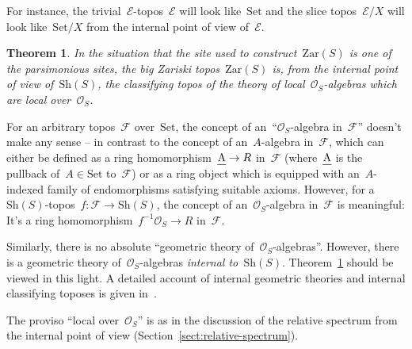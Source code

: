 \documentclass[10pt,reqno,a4paper]{amsbook}
\theoremstyle{definition}
\theoremstyle{plain}
\newtheorem{thm}[defn]{Theorem}
\theoremstyle{remark}
\newcommand{\E}{\mathcal{E}}
\newcommand{\F}{\mathcal{F}}
\renewcommand{\O}{\mathcal{O}}
\let\oldul\ul
\renewcommand{\ul}[1]{\text{\oldul{$#1$}}}
\newcommand{\Set}{\mathrm{Set}}
\newcommand{\Sh}{\mathrm{Sh}}
\newcommand{\Zar}{\mathrm{Zar}}
\newcommand{\?}{\,{:}\,}
\renewcommand{\_}{\mathpunct{.}\,}
\begin{document}
For instance, the trivial~$\E$-topos~$\E$ will look like~$\Set$ and the
slice topos~$\E/X$ will look like~$\Set/X$ from the internal point of
view of~$\E$.

\begin{thm}\label{thm:zar-classifies}
In the situation that the site used to construct~$\Zar(S)$ is one of the
parsimonious sites, the big Zariski topos~$\Zar(S)$ is, from the internal point
of view of~$\Sh(S)$, the classifying topos of
the theory of local~$\O_S$-algebras which are local over~$\O_S$.
\end{thm}

For an arbitrary topos~$\F$ over~$\Set$, the concept of an~``$\O_S$-algebra
in~$\F$'' doesn't make any sense -- in contrast to the concept of
an~$A$-algebra in~$\F$, which can either be defined as a ring
homomorphism~$\ul{A} \to R$ in~$\F$ (where~$\ul{A}$ is the pullback of~$A \in
\Set$ to~$\F$) or as a ring object which is equipped with an~$A$-indexed family of
endomorphisms satisfying suitable axioms. However, for a~$\Sh(S)$-topos~$f : \F \to
\Sh(S)$, the concept of an~$\O_S$-algebra in~$\F$ is meaningful: It's a ring
homomorphism~$f^{-1}\O_S \to R$ in~$\F$.

Similarly, there is no absolute ``geometric theory of~$\O_S$-algebras''.
However, there is a geometric theory of~$\O_S$-algebras \emph{internal
to~$\Sh(S)$}. Theorem~\ref{thm:zar-classifies} should be viewed in this light.
A detailed account of internal geometric theories and internal classifying toposes
is given in~\cite[Chapter~II]{henry:classifying-topoi}.

The proviso ``local over~$\O_S$'' is as in the discussion of the relative
spectrum from the internal point of view
(Section~\ref{sect:relative-spectrum}).
\end{document}
